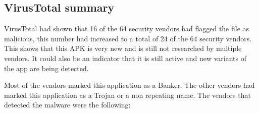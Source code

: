 \subsection{VirusTotal summary}

VirusTotal had shown that 16 of the 64 security vendors had flagged the file as malicious, 
this number had increased to a total of 24 of the 64 security vendors. 
This shows that this APK is very new and is still not researched by multiple vendors. 
It could also be an indicator that it is still active and new variants of the app are being detected. 

Most of the vendors marked this application as a Banker. 
The other vendors had marked this application as a Trojan or a non repeating name.
The vendors that detected the malware were the following:

